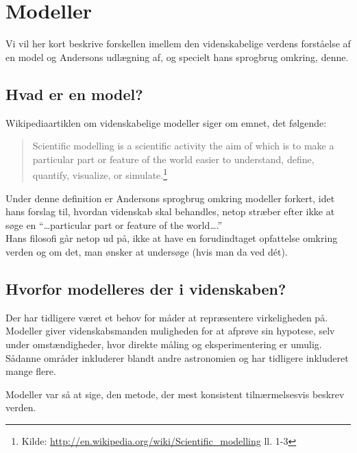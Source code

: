 \section{Modeller}
Vi vil her kort beskrive forskellen imellem den videnskabelige verdens
forståelse af en model og Andersons udlægning af, og specielt hans sprogbrug
omkring, denne.

\subsection{Hvad er en model?}
Wikipediaartiklen om videnskabelige modeller siger om emnet, det følgende:
\begin{quote}
Scientific modelling is a scientific activity the aim of which is to make a
particular part or feature of the world easier to understand, define, quantify, visualize, or simulate.\footnote{Kilde: {\url{http://en.wikipedia.org/wiki/Scientific_modelling}} ll. 1-3}
\end{quote}

Under denne definition er Andersons sprogbrug omkring modeller forkert, idet
hans forslag til, hvordan videnskab skal behandles, netop stræber efter ikke at
søge en ``\ldots particular part or feature of the world\ldots.''\\
Hans filosofi går netop ud på, ikke at have en forudindtaget opfattelse omkring
verden og om det, man ønsker at undersøge (hvis man da ved dét).

\subsection{Hvorfor modelleres der i videnskaben?}
Der har tidligere været et behov for måder at repræsentere virkeligheden på.
Modeller giver videnskabsmanden muligheden for at afprøve sin hypotese, selv
under omstændigheder, hvor direkte måling og eksperimentering er umulig.\\
Sådanne områder inkluderer blandt andre astronomien og har tidligere inkluderet
mange flere.

Modeller var så at sige, den metode, der mest konsistent tilnærmelsesvis beskrev
verden.

